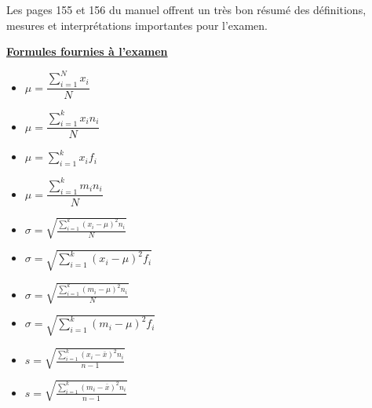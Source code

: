 \documentclass[12pt]{exam}
\theoremstyle{definition}       %
\begin{document}
\begin{questions}
\begin{parts}
\end{parts}

\vspace{1cm}

Les pages 155 et 156 du manuel offrent un très bon résumé des définitions, mesures et interprétations importantes pour l'examen.

\newpage

\begin{center}
\underline{\textbf{\LARGE{Formules fournies à l'examen}}}
\end{center}

\vspace{1cm}

\begin{itemize}
\item $\mu=\dfrac{\sum\limits_{i=1}^{N}x_{i}}{N}$
\vspace{0.3cm}

\item $\mu=\dfrac{\sum\limits_{i=1}^{k}x_{i}n_{i}}{N}$

\vspace{0.3cm}

\item $\mu=\sum\limits_{i=1}^{k}x_{i}f_{i}$
\vspace{0.3cm}

\item $\mu=\dfrac{\sum\limits_{i=1}^{k}m_{i}n_{i}}{N}$

\vspace{0.3cm}

\item $\sigma=\sqrt{\frac{\sum\limits_{i=1}^{k}(x_{i}-\mu)^{2}n_{i}}{N}}$

\vspace{0.3cm}

\item $\sigma=\sqrt{\sum\limits_{i=1}^{k}(x_{i}-\mu)^{2}f_{i}}$

\vspace{0.3cm}

\item $\sigma=\sqrt{\frac{\sum\limits_{i=1}^{k}(m_{i}-\mu)^{2}n_{i}}{N}}$

\vspace{0.3cm}

\item $\sigma=\sqrt{\sum\limits_{i=1}^{k}(m_{i}-\mu)^{2}f_{i}}$

\vspace{0.3cm}

\item $s=\sqrt{\frac{\sum\limits_{i=1}^{k}(x_{i}-\bar{x})^{2}n_{i}}{n-1}}$

\vspace{0.3cm}

\item $s=\sqrt{\frac{\sum\limits_{i=1}^{k}(m_{i}-\bar{x})^{2}n_{i}}{n-1}}$
\end{itemize}


\end{questions}
\end{document}
